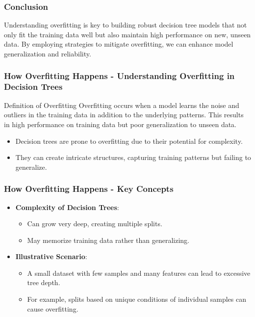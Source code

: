 \documentclass[aspectratio=169]{beamer}
\begin{document}
\begin{frame}[fragile]
  \frametitle{Conclusion}
  Understanding overfitting is key to building robust decision tree models that not only fit the training data well but also maintain high performance on new, unseen data. By employing strategies to mitigate overfitting, we can enhance model generalization and reliability.
\end{frame}

\begin{frame}[fragile]
  \frametitle{How Overfitting Happens - Understanding Overfitting in Decision Trees}
  
  \begin{block}{Definition of Overfitting}
      Overfitting occurs when a model learns the noise and outliers in the training data in addition to the underlying patterns. This results in high performance on training data but poor generalization to unseen data.
  \end{block}
  
  \begin{itemize}
      \item Decision trees are prone to overfitting due to their potential for complexity.
      \item They can create intricate structures, capturing training patterns but failing to generalize.
  \end{itemize}
\end{frame}

\begin{frame}[fragile]
  \frametitle{How Overfitting Happens - Key Concepts}

  \begin{itemize}
      \item \textbf{Complexity of Decision Trees}:
      \begin{itemize}
          \item Can grow very deep, creating multiple splits.
          \item May memorize training data rather than generalizing.
      \end{itemize}
      
      \item \textbf{Illustrative Scenario}:
      \begin{itemize}
          \item A small dataset with few samples and many features can lead to excessive tree depth.
          \item For example, splits based on unique conditions of individual samples can cause overfitting.
      \end{itemize}
  \end{itemize}
\end{frame}
\end{document}

